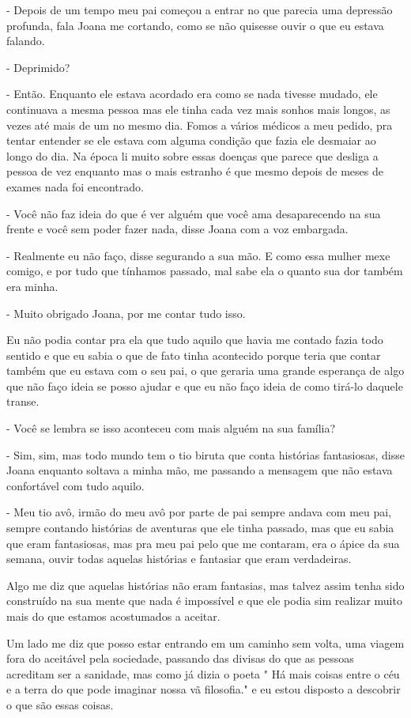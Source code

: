 - Depois de um tempo meu pai começou a entrar no que parecia uma depressão profunda, fala Joana me cortando, como se não quisesse ouvir o que eu estava falando.

- Deprimido?

- Então. Enquanto ele estava acordado era como se nada tivesse mudado, ele continuava a mesma pessoa mas ele tinha cada vez mais sonhos mais longos, as vezes até mais de um no mesmo dia. Fomos a vários médicos a meu pedido, pra tentar entender se ele estava com alguma condição que fazia ele desmaiar ao longo do dia. Na época li muito sobre essas doenças que parece que desliga a pessoa de vez enquanto mas o mais estranho é que mesmo depois de meses de exames nada foi encontrado.

- Você não faz ideia do que é ver alguém que você ama desaparecendo na sua frente e você sem poder fazer nada, disse Joana com a voz embargada.

- Realmente eu não faço, disse segurando a sua mão. E como essa mulher mexe comigo, e por tudo que tínhamos passado, mal sabe ela o quanto sua dor também era minha.

- Muito obrigado Joana, por me contar tudo isso.

Eu não podia contar pra ela que tudo aquilo que havia me contado fazia todo sentido e que eu sabia o que de fato tinha acontecido porque teria que contar também que eu estava com o seu pai, o que geraria uma grande esperança de algo que não faço ideia se posso ajudar e que eu não faço ideia de como tirá-lo daquele transe.

- Você se lembra se isso aconteceu com mais alguém na sua família?

- Sim, sim, mas todo mundo tem o tio biruta que conta histórias fantasiosas, disse Joana enquanto soltava a minha mão, me passando a mensagem que não estava confortável com tudo aquilo.

- Meu tio avô, irmão do meu avô por parte de pai sempre andava com meu pai, sempre contando histórias de aventuras que ele tinha passado, mas que eu sabia que eram fantasiosas, mas pra meu pai pelo que me contaram, era o ápice da sua semana, ouvir todas aquelas histórias e fantasiar que eram verdadeiras.

Algo me diz que aquelas histórias não eram fantasias, mas talvez assim tenha sido construído na sua mente que nada é impossível e que ele podia sim realizar muito mais do que estamos acostumados a aceitar.

Um lado me diz que posso estar entrando em um caminho sem volta, uma viagem fora do aceitável pela sociedade, passando das divisas do que as pessoas acreditam ser a sanidade, mas como já dizia o poeta " Há mais coisas entre o céu e a terra do que pode imaginar nossa vã filosofia." e eu estou disposto a descobrir o que são essas coisas.

